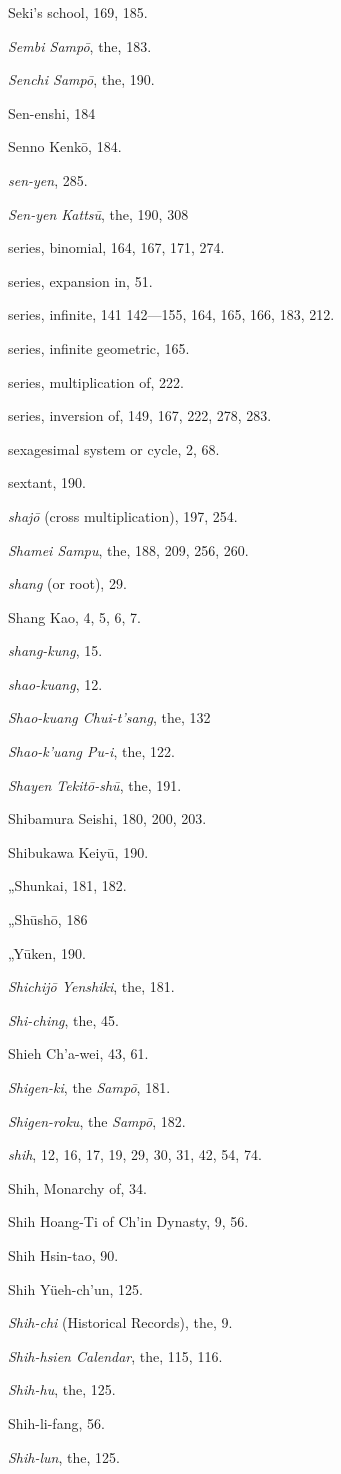 \documentclass[11pt]{article}
\begin{document}
Seki's school, 169, 185.\par
\emph{Sembi Sampō}, the, 183.\par
\emph{Senchi Sampō}, the, 190.\par
Sen-enshi, 184\par
Senno Kenkō, 184.\par
\emph{sen-yen}, 285.\par
\emph{Sen-yen Kattsū}, the, 190, 308\par
series, binomial, 164, 167, 171, 274.\par
series, expansion in, 51.\par
series, infinite, 141 142—155, 164, 165, 166, 183, 212.\par
series, infinite geometric, 165.\par
series, multiplication of, 222.\par
series, inversion of, 149, 167, 222, 278, 283.\par
sexagesimal system or cycle, 2, 68.\par
sextant, 190.\par
\emph{shajō} (cross multiplication), 197, 254.\par
\emph{Shamei Sampu}, the, 188, 209, 256, 260.\par
\emph{shang} (or root), 29.\par
Shang Kao, 4, 5, 6, 7.\par
\emph{shang-kung}, 15.\par
\emph{shao-kuang}, 12.\par
\emph{Shao-kuang Chui-t'sang}, the, 132\par
\emph{Shao-k'uang Pu-i}, the, 122.\par
\emph{Shayen Tekitō-shū}, the, 191.\par
Shibamura Seishi, 180, 200, 203.\par
Shibukawa Keiyū, 190.\par
\quad „\quad Shunkai, 181, 182.\par
\quad „\quad Shūshō, 186\par
\quad „\quad Yūken, 190.\par
\emph{Shichijō Yenshiki}, the, 181.\par
\emph{Shi-ching}, the, 45.\par
Shieh Ch'a-wei, 43, 61.\par
\emph{Shigen-ki}, the \emph{Sampō}, 181.\par
\emph{Shigen-roku}, the \emph{Sampō}, 182.\par
\emph{shih}, 12, 16, 17, 19, 29, 30, 31, 42, 54, 74.\par
Shih, Monarchy of, 34.\par
Shih Hoang-Ti of Ch'in Dynasty, 9, 56.\par
Shih Hsin-tao, 90.\par
Shih Yüeh-ch'un, 125.\par
\emph{Shih-chi} (Historical Records), the, 9.\par
\emph{Shih-hsien Calendar}, the, 115, 116.\par
\emph{Shih-hu}, the, 125.\par
Shih-li-fang, 56.\par
\emph{Shih-lun}, the, 125.\par
\end{document}
